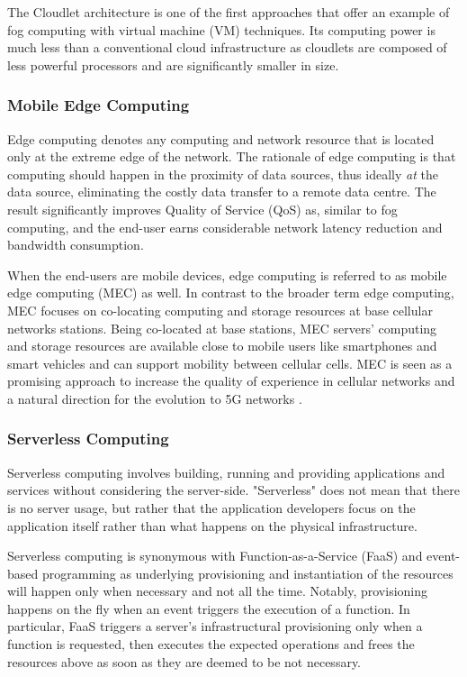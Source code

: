 The Cloudlet \cite{cloudlet} architecture is one of the first approaches that offer an example of fog computing with virtual machine (VM) techniques. Its computing power is much less than a conventional cloud infrastructure as cloudlets are composed of less powerful processors and are significantly smaller in size.

\subsubsection{Mobile Edge Computing}

Edge computing \cite{edge-computing-vision-challenges} denotes any computing and network resource that is located only at the extreme edge of the network. The rationale of edge computing is that computing should happen in the proximity of data sources, thus ideally \emph{at} the data source, eliminating the costly data transfer to a remote data centre. The result significantly improves Quality of Service (QoS) as, similar to fog computing, and the end-user earns considerable network latency reduction and bandwidth consumption.

When the end-users are mobile devices, edge computing is referred to as mobile edge computing (MEC) \cite{mec} as well. In contrast to the broader term edge computing, MEC focuses on co-locating computing and storage resources at base cellular networks stations. Being co-located at base stations, MEC servers' computing and storage resources are available close to mobile users like smartphones and smart vehicles and can support mobility between cellular cells. MEC is seen as a promising approach to increase the quality of experience in cellular networks and a natural direction for the evolution to 5G networks \cite{nfv-5g}.

\subsubsection{Serverless Computing}

Serverless computing \cite{serverless-berkeley} involves building, running and providing applications and services without considering the server-side. "Serverless" does not mean that there is no server usage, but rather that the application developers focus on the application itself rather than what happens on the physical infrastructure.

Serverless computing is synonymous with Function-as-a-Service (FaaS) and event-based programming as underlying provisioning and instantiation of the resources will happen only when necessary and not all the time. Notably, provisioning happens on the fly when an event triggers the execution of a function. In particular, FaaS triggers a server's infrastructural provisioning only when a function is requested, then executes the expected operations and frees the resources above as soon as they are deemed to be not necessary.

